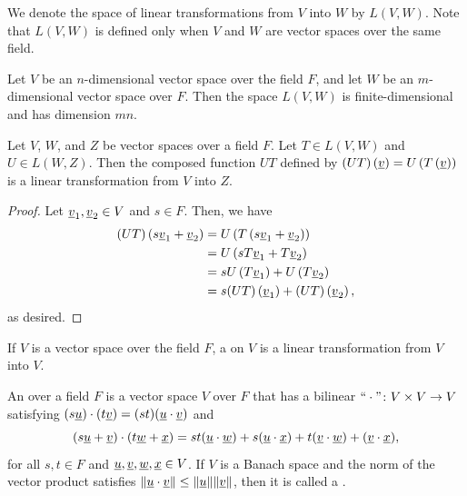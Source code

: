 We denote the space of linear transformations from $V$ into $W$ by $L(V,W)$.
Note that $L(V,W)$ is defined only when $V$ and $W$ are vector spaces over the same field.

\begin{fact}
Let $V$ be an $n$-dimensional vector space over the field $F$, and let $W$ be an $m$-dimensional vector space over $F$.
Then the space $L(V,W)$ is finite-dimensional and has dimension $mn$.
\end{fact}

\begin{theorem}
Let $V$, $W$, and $Z$ be vector spaces over a field $F$.
Let $T \in L(V,W)$ and $U \in L(W,Z)$.
Then the composed function $UT$ defined by $(UT) \left( \underline{v} \right) = U \left( T \left( \underline{v} \right) \right)$ is a linear transformation from $V$ into $Z$.
\end{theorem}
\begin{proof}
Let $\underline{v}_1, \underline{v}_2 \in V$ and $s \in F$.
Then, we have
\begin{equation*}
\begin{split}
(UT) \left( s \underline{v}_1 + \underline{v}_2 \right)
&= U \left( T \left( s \underline{v}_1 + \underline{v}_2 \right) \right) \\
&= U \left( s T \underline{v}_1 + T \underline{v}_2 \right) \\
&= s U \left( T \underline{v}_1 \right) + U \left( T \underline{v}_2 \right) \\
&= s (UT) \left( \underline{v}_1 \right) + (UT) \left( \underline{v}_2 \right) ,
\end{split}
\end{equation*}
as desired.
\end{proof}

\begin{definition}
If $V$ is a vector space over the field $F$, a  on $V$ is a linear transformation from $V$ into $V$.
\end{definition}

\begin{definition}
An  over a field $F$ is a vector space $V$ over $F$ that has a bilinear  $``\cdot" \colon V \times V \to V$ satisfying
$(s\underline{u})\cdot(t\underline{v})=(st)(\underline{u}\cdot \underline{v})$ and
\[ (s\underline{u} + \underline{v})\cdot (t \underline{w} + \underline{x}) = st ( \underline{u}\cdot \underline{w}) + s (\underline{u}\cdot \underline{x}) + t (\underline{v}\cdot \underline{w}) + (\underline{v}\cdot \underline{x}), \]
for all $s,t\in F$ and $\underline{u},\underline{v},\underline{w},\underline{x} \in V$.
If $V$ is a Banach space and the norm of the vector product satisfies $\| \underline{u} \cdot \underline{v} \| \leq \|\underline{u}\| \|\underline{v}\|$, then it is called a .
\end{definition}

